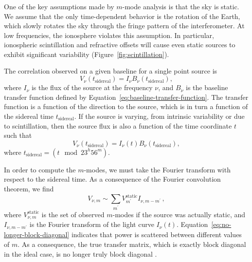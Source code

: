 \documentclass[twocolumn]{aastex61}
\begin{document}
One of the key assumptions made by $m$-mode analysis is that the sky is static.  We assume that the
only time-dependent behavior is the rotation of the Earth, which slowly rotates the sky through the
fringe pattern of the interferometer. At low frequencies, the ionosphere violates this assumption.
In particular, ionospheric scintillation and refractive offsets will cause even static sources to
exhibit significant variability (Figure~\ref{fig:scintillation}).

The correlation observed on a given baseline for a single point source is
\begin{equation}
    V_\nu(t_{\textrm{sidereal}}) = I_\nu B_\nu(t_{\textrm{sidereal}}),
\end{equation}
where $I_\nu$ is the flux of the source at the frequency $\nu$, and $B_\nu$ is the baseline transfer
function defined by Equation~\ref{eq:baseline-transfer-function}. The transfer function is a
function of the direction to the source, which is in turn a function of the sidereal time
$t_{\textrm{sidereal}}$. If the source is varying, from intrinsic variability or due to
scintillation, then the source flux is also a function of the time coordinate $t$ such that
\begin{equation}
    V_\nu(t_{\textrm{sidereal}}) = I_\nu(t) B_\nu(t_{\textrm{sidereal}}),
\end{equation}
where $t_{\textrm{sidereal}} = (t \mod 23^h56^m)$.

In order to compute the $m$-modes, we must take the Fourier transform with respect to the sidereal
time. As a consequence of the Fourier convolution theorem, we find
\begin{equation}\label{eq:no-longer-block-diagonal}
    V_{\nu, m} \sim \sum_{m^\prime} V_{m^\prime}^\textrm{static} I_{\nu, m-m^\prime}\,,
\end{equation}
where $V_{\nu, m}^{\textrm{static}}$ is the set of observed $m$-modes if the source was actually
static, and $I_{\nu, m-m^\prime}$ is the Fourier transform of the light curve $I_{\nu}(t)$.
Equation~\ref{eq:no-longer-block-diagonal} indicates that power is scattered between different
values of $m$. As a consequence, the true transfer matrix, which is exactly block diagonal in the
ideal case, is no longer truly block diagonal \citep{richard_ionosphere_thoughts}.
\end{document}
